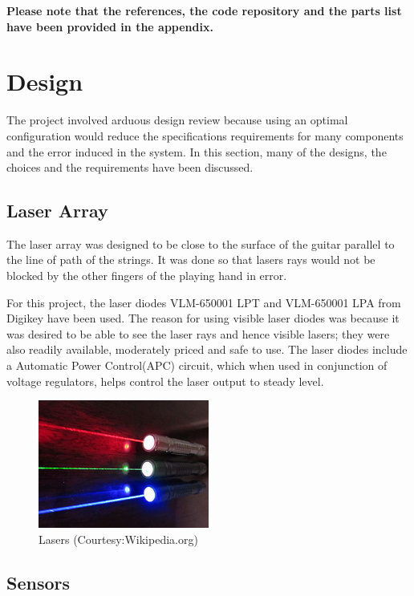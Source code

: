 \documentclass[11pt]{article}
\begin{document}
\textbf{Please note that the references, the code repository and the parts list have been provided in the appendix.}


\section{Design}

The project involved arduous design review because using an optimal configuration  would reduce the specifications requirements for many components and the error induced in the system. In this section, many of the designs, the choices and the requirements have been discussed.

\subsection{Laser Array}

The laser array was designed to be close to the surface of the guitar parallel to the line of path of the strings. It was done so that lasers rays would not be blocked by the other fingers of the playing hand in error. 

For this project, the laser diodes VLM-650001 LPT and VLM-650001 LPA from Digikey have been used. The reason for using visible laser diodes was because it was desired to be able to see the laser rays and hence visible lasers; they were also readily available, moderately priced and safe to use.  The laser diodes include a Automatic Power Control(APC) circuit, which when used in conjunction of voltage regulators, helps control the laser output to steady level.

\begin{figure}[!h]
\centering
\includegraphics[width=0.5\textwidth]{lasers.jpg}
\caption{Lasers (Courtesy:Wikipedia.org)}
\label{lasers}
\end{figure}

\newpage{}

\subsection{Sensors}
\end{document}
